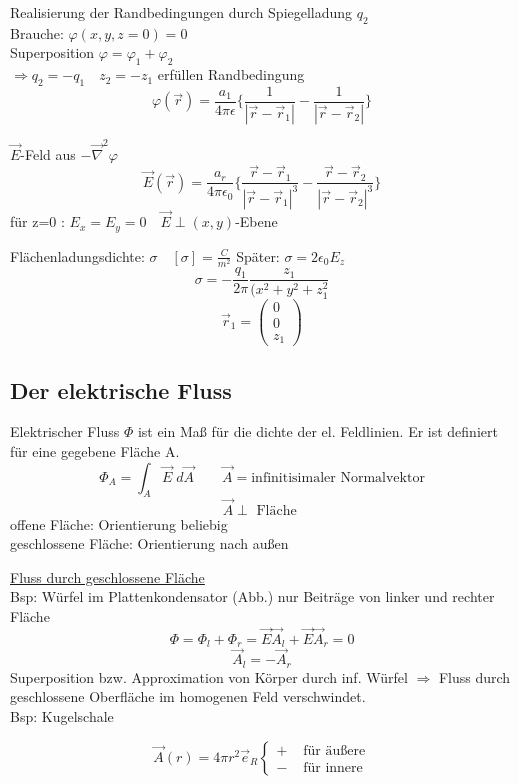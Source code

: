 \documentclass[titlepage,12pt,a4paper,ngerman]{report}
\begin{document}
Realisierung der Randbedingungen durch Spiegelladung $q_2$\\
Brauche: $\varphi(x,y,z=0) = 0$\\
Superposition $\varphi = \varphi_1 + \varphi_2$\\
$\Rightarrow q_2 = - q_1 \quad z_2 = - z_1$ erfüllen Randbedingung\\
$$\varphi(\vec{r}) = \frac{a_1}{4\pi\epsilon} \{ \frac{1}{|\vec{r}-\vec{r}_1|} - \frac{1}{| \vec{r} - \vec{r}_2|}\}$$

$\vec{E}$-Feld aus $-\vec{\nabla}^2 \varphi$\\
$$ \vec{E}(\vec{r}) = \frac{a_r}{4\pi\epsilon_0} \bigg\{ \frac{\vec{r} - \vec{r}_1}{|\vec{r} - \vec{r}_1|^3} - \frac{\vec{r} - \vec{r}_2}{|\vec{r} - \vec{r}_2|^3} \bigg\}$$
für z=0 : $ E_x = E_y = 0 \quad \vec{E} \perp (x,y)$-Ebene

Flächenladungsdichte: $\sigma \quad [\sigma] = \frac{C}{m^2}$
Später: $ \sigma = 2 \epsilon_0 E_z$
$$\sigma = - \frac{q_1}{2\pi} \frac{z_1}{(x^2+y^2+z_1^2}$$
$$ \vec{r}_1 = \begin{pmatrix}
0\\0\\z_1
\end{pmatrix}$$

\subsection{Der elektrische Fluss}
Elektrischer Fluss $\Phi$ ist ein Maß für die dichte der el. Feldlinien. Er ist definiert für eine gegebene Fläche A.
$$ \Phi_A = \int_{A} \vec{E} \;d \vec{A} \qquad \vec{A} = \textrm{infinitisimaler Normalvektor}$$
$$ \vec{A} \perp \textrm{ Fläche }$$
offene Fläche: Orientierung beliebig\\
geschlossene Fläche: Orientierung nach außen\par
\underline{Fluss durch geschlossene Fläche}\\
Bsp: Würfel im Plattenkondensator (Abb.) nur Beiträge von linker und rechter Fläche 
$$ \Phi = \Phi_l + \Phi_r = \vec{E} \vec{A}_l + \vec{E} \vec{A}_r = 0$$
$$ \vec{A}_l = - \vec{A}_r$$
Superposition bzw. Approximation von Körper durch inf. Würfel $\Rightarrow$ Fluss durch geschlossene Oberfläche im homogenen Feld verschwindet.\\
Bsp: Kugelschale

$$\vec{A}(r) = 4 \pi r^2 \vec{e}_R \left\{\begin{array}{ll}
+ & \textrm{ für äußere} \\
- & \textrm{ für innere}
\end{array}\right.$$
\end{document}
